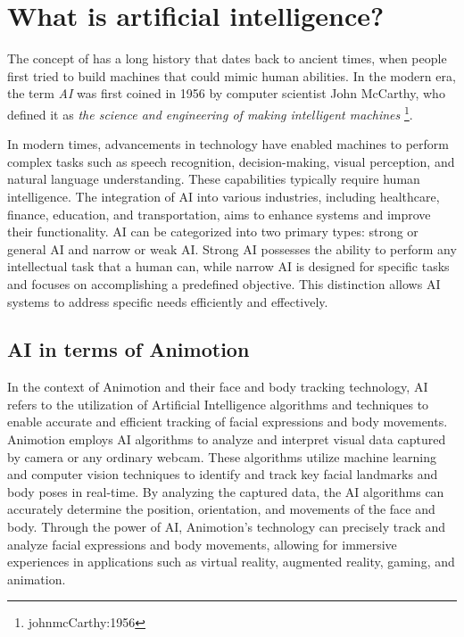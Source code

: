 \section{What is artificial intelligence?}
The concept of  has a long history that dates back to ancient times,
when people first tried to build machines that could mimic human abilities.
In the modern era, the term \textit{AI}  was first coined in 1956 by computer scientist 
John McCarthy, who defined it as \textit{the science and engineering of making 
intelligent machines} \footnote{johnmcCarthy:1956}.

In modern times, advancements in technology have enabled machines to perform complex tasks such as speech recognition, 
decision-making, visual perception, and natural language understanding. These capabilities typically require human 
intelligence. The integration of AI into various industries, including healthcare, finance, 
education, and transportation, aims to enhance systems and improve their functionality. 
AI can be categorized into two primary types: strong or general AI and narrow or weak AI. 
Strong AI possesses the ability to perform any intellectual task that a human can, while narrow 
AI is designed for specific tasks and focuses on accomplishing a predefined objective. 
This distinction allows AI systems to address specific needs efficiently and effectively. \cite{KindsOfAI}

\subsection{AI in terms of Animotion}
In the context of Animotion and their face and body tracking technology, AI refers to the utilization of Artificial Intelligence algorithms 
and techniques to enable accurate and efficient tracking of facial expressions and body movements.
Animotion employs AI algorithms to analyze and interpret visual data captured by camera or any ordinary webcam. These algorithms utilize machine learning and 
computer vision techniques to identify and track key facial landmarks and body poses in real-time. By analyzing the captured data, the 
AI algorithms can accurately determine the position, orientation, and movements of the face and body.
Through the power of AI, Animotion's technology can precisely track and analyze facial expressions and body movements, allowing for 
immersive experiences in applications such as virtual reality, augmented reality, gaming, and animation.

